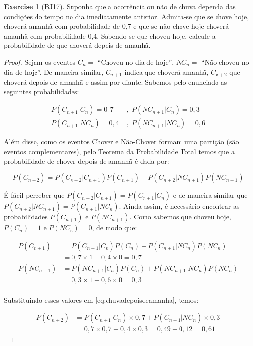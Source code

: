 \documentclass[
]{article}
\theoremstyle{definition}
\theoremstyle{definition}
\theoremstyle{definition}
\newtheorem{exercise}{Exercise}[section]
\theoremstyle{definition}
\theoremstyle{remark}
\begin{document}
\begin{exercise}[BJ17]

Suponha que a ocorrência ou não de chuva dependa das condições do tempo no dia imediatamente anterior. Admita-se que se chove hoje, choverá amanhã com probabilidade de 0,7 e que se não chove hoje choverá amanhã com probabilidade 0,4. Sabendo-se que choveu hoje, calcule a probabilidade de que choverá depois de amanhã.

\begin{proof}
Sejam os eventos \(C_{n} =\) ``Choveu no dia de hoje'', \(NC_{n} =\) ``Não choveu no dia de hoje''. De maneira similar, \(C_{n+1}\) indica que choverá amanhã, \(C_{n+2}\) que choverá depois de amanhã e assim por diante. Sabemos pelo enunciado as seguintes probabilidades:

\begin{align*}
P(C_{n+1}|C_{n}) = 0,7 \; &, \; P(NC_{n+1}|C_{n}) = 0,3 \\
P(C_{n+1}|NC_{n}) = 0,4 \; &, \; P(NC_{n+1}|NC_{n}) = 0,6
\end{align*}

Além disso, como os eventos Chover e Não-Chover formam uma partição (são eventos complementares), pelo Teorema da Probabilidade Total temos que a probabilidade de chover depois de amanhã é dada por:

\begin{equation}
P(C_{n+2}) = P(C_{n+2}|C_{n+1})P(C_{n+1}) + P(C_{n+2}|NC_{n+1})P(NC_{n+1})
\label{eq:chuvadepoisdeamanha}
\end{equation}

É fácil perceber que \(P(C_{n+2}|C_{n+1}) = P(C_{n+1}|C_{n})\) e de maneira similar que \(P(C_{n+2}|NC_{n+1}) = P(C_{n+1}|NC_{n})\). Ainda assim, é necessário encontrar as probabilidades \(P(C_{n+1})\) e \(P(NC_{n+1})\). Como sabemos que choveu hoje, \(P(C_{n}) = 1\) e \(P(NC_{n}) = 0\), de modo que:

\begin{align*}
P(C_{n+1}) &= P(C_{n+1}|C_{n})P(C_{n}) + P(C_{n+1}|NC_{n})P(NC_{n}) \\
&= 0,7 \times 1 + 0,4 \times 0 = 0,7 \\
P(NC_{n+1}) &= P(NC_{n+1}|C_{n})P(C_{n}) + P(NC_{n+1}|NC_{n})P(NC_{n}) \\
&= 0,3 \times 1 + 0,6 \times 0 = 0,3 \\
\end{align*}

Substituindo esses valores em \eqref{eq:chuvadepoisdeamanha}, temos:

\begin{align*}
P(C_{n+2}) &= P(C_{n+1}|C_{n}) \times 0,7 + P(C_{n+1}|NC_{n}) \times 0,3 \\
&= 0,7 \times 0,7 + 0,4 \times 0,3 = 0,49 + 0,12 = 0,61
\end{align*}
\end{proof}

\end{exercise}
\end{document}
